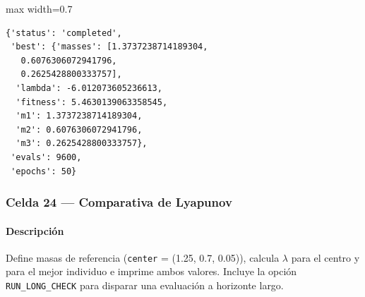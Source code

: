 \begin{listing}[H]
\caption{Ejemplo Salida}
\begin{adjustbox}{max width=0.7\textwidth}
\begin{minipage}{\textwidth}
\begin{verbatim}
{'status': 'completed',
 'best': {'masses': [1.3737238714189304,
   0.6076306072941796,
   0.2625428800333757],
  'lambda': -6.012073605236613,
  'fitness': 5.4630139063358545,
  'm1': 1.3737238714189304,
  'm2': 0.6076306072941796,
  'm3': 0.2625428800333757},
 'evals': 9600,
 'epochs': 50}
\end{verbatim}
\end{minipage}
\end{adjustbox}
\end{listing}

\subsubsection*{Celda 24 — Comparativa de Lyapunov}
\paragraph{Descripción} Define masas de referencia (\texttt{center} = (1.25, 0.7, 0.05)), calcula $\lambda$ para el centro y para el mejor individuo e imprime ambos valores. Incluye la opción \texttt{RUN\_LONG\_CHECK} para disparar una evaluación a horizonte largo.
